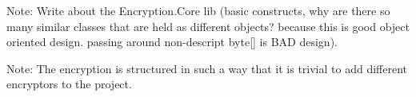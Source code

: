 Note: Write about the Encryption.Core lib (basic constructs, why are there so many similar classes that are held
as different objects? because this is good object oriented design. passing around non-descript byte[] is BAD design).

Note: The encryption is structured in such a way that it is trivial to add different encryptors to the project.